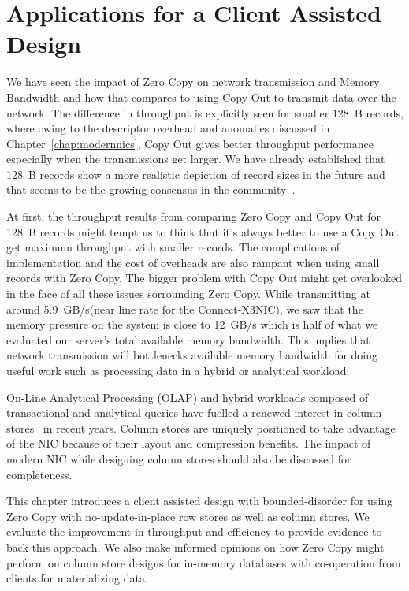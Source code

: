 
\chapter{Applications for a Client Assisted Design}
\label{chap:applications}

We have seen the impact of Zero Copy on network transmission and Memory Bandwidth and how that 
compares to using Copy Out to transmit data over the network. The difference
in throughput is explicitly seen for smaller 128~B records, where owing to the descriptor overhead and anomalies discussed 
in Chapter~\ref{chap:modernnics}, Copy Out gives better throughput performance especially when the transmissions get larger.
We have already established that 128~B records show a more realistic depiction of record sizes in the future
and that seems to be the growing consensus in the community~\cite{fb-memcache,fb-workload,inmemoryworkload}. 

At first, the throughput results from comparing Zero Copy and Copy Out for 128~B 
records might tempt us to think that it's always better to use a Copy Out get maximum throughput with smaller records.
The complications of implementation and the cost of overheads are also rampant when using small records with Zero Copy.
The bigger problem with Copy Out might get overlooked in the face of all these issues sorrounding Zero Copy.
While transmitting at around 5.9~GB/s(near line rate for the Connect-X3\textregistered NIC),
we saw that the memory pressure on the system is close to 12~GB/s which is half of what we evaluated our server's total available memory bandwidth. 
This implies that network transmission will bottlenecks available memory bandwidth for doing useful work such as processing data in a hybrid or analytical workload.

On-Line Analytical Processing (OLAP) and hybrid workloads composed of transactional and analytical queries have fuelled a renewed interest in column stores~\cite{cstore,cstorevsrowstore} in recent years. 
Column stores are uniquely positioned to take advantage of the NIC because of their layout and compression benefits.
 The impact of modern NIC while designing column stores should also be discussed for completeness. 

This chapter introduces a client assisted design with bounded-disorder for using Zero Copy with no-update-in-place row stores as well as column stores. 
We evaluate the improvement in throughput and efficiency to provide evidence to back this approach.
We also make informed opinions on how Zero Copy might perform on column store designs 
for in-memory databases with co-operation from clients for materializing data.


